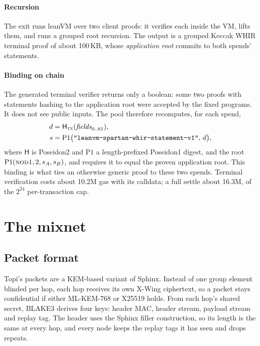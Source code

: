 \documentclass[11pt,a4paper]{article}
\newcommand{\Hf}{\mathsf{H}}
\begin{document}
\paragraph{Recursion} The exit runs leanVM over two client proofs: it verifies each inside the VM,
lifts them, and runs a grouped root recursion. The output is a grouped Keccak WHIR terminal proof of
about 100\,KB, whose \emph{application root} commits to both spends' statements.

\paragraph{Binding on chain} The generated terminal verifier returns only a boolean: some two proofs
with statements hashing to the application root were accepted by the fixed programs. It does not see
public inputs. The pool therefore recomputes, for each spend,
\begin{align*}
  d &= \Hf_{\textsc{tx}}(\mathit{fields}_{0..81}), \\
  s &= \mathrm{P1}\big(\texttt{"leanvm-spartan-whir-statement-v1"},\, d\big),
\end{align*}
where $\Hf$ is Poseidon2 and $\mathrm{P1}$ a length-prefixed Poseidon1 digest, and the root $\mathrm{P1}(\textsc{nod1}, 2, s_A, s_B)$, and requires it to equal the proven application
root. This binding is what ties an otherwise generic proof to these two spends. Terminal verification
costs about 10.2M gas with its calldata; a full settle about 16.3M, of the $2^{24}$ per-transaction cap.

\section{The mixnet}

\subsection{Packet format}
Topi's packets are a KEM-based variant of Sphinx. Instead of one group element blinded per hop, each hop
receives its own X-Wing ciphertext, so a packet stays confidential if either ML-KEM-768 or X25519 holds.
From each hop's shared secret, BLAKE3 derives four keys: header MAC, header stream, payload stream and
replay tag. The header uses the Sphinx filler construction, so its length is the same at every hop, and
every node keeps the replay tags it has seen and drops repeats.
\end{document}
